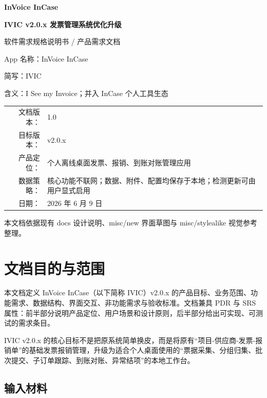 \documentclass[UTF8,zihao=-4]{ctexart}
\begin{document}
\begin{titlepage}
  \centering
  \vspace*{2.0cm}
  {\Huge\bfseries\color{ivicBrown} InVoice InCase\par}
  \vspace{0.3cm}
  {\Large\bfseries IVIC v2.0.x 发票管理系统优化升级\par}
  \vspace{0.8cm}
  {\LARGE 软件需求规格说明书 / 产品需求文档\par}
  \vspace{1.2cm}
  {\large App 名称：InVoice InCase\par}
  \vspace{0.2cm}
  {\large 简写：IVIC\par}
  \vspace{0.2cm}
  {\large 含义：I See my Invoice；并入 InCase 个人工具生态\par}
  \vfill
  \begin{tabular}{rl}
    文档版本： & 1.0 \\
    目标版本： & v2.0.x \\
    产品定位： & 个人离线桌面发票、报销、到账对账管理应用 \\
    数据策略： & 核心功能不联网；数据、附件、配置均保存于本地；检测更新可由用户显式启用 \\
    日期： & 2026 年 6 月 9 日 \\
  \end{tabular}
  \vfill
  {\small 本文档依据现有 docs 设计说明、misc/new 界面草图与 misc/stylealike 视觉参考整理。}
\end{titlepage}

\tableofcontents
\newpage

\section{文档目的与范围}

本文档定义 InVoice InCase（以下简称 IVIC）v2.0.x 的产品目标、业务范围、功能需求、数据结构、界面交互、非功能需求与验收标准。文档兼具 PDR 与 SRS 属性：前半部分说明产品定位、用户场景和设计原则，后半部分给出可实现、可测试的需求条目。

IVIC v2.0.x 的核心目标不是把原系统简单换皮，而是将原有“项目-供应商-发票-报销单”的基础发票报销管理，升级为适合个人桌面使用的“票据采集、分组归集、批次提交、子订单跟踪、到账对账、异常结项”的本地工作台。

\subsection{输入材料}
\end{document}
